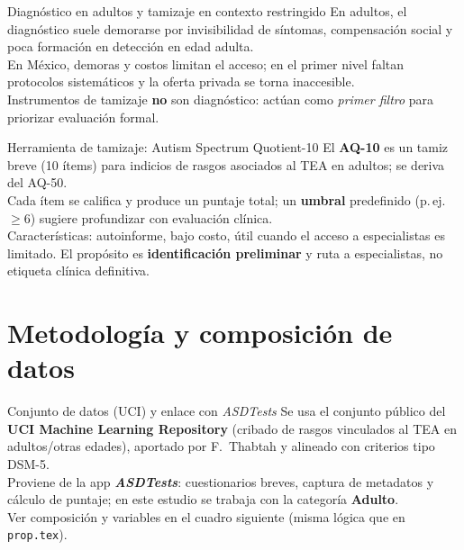 \documentclass[11pt]{beamer}
\begin{document}
\begin{frame}{Diagnóstico en adultos y tamizaje en contexto restringido}
  En adultos, el diagnóstico suele demorarse por invisibilidad de síntomas, compensación social y poca formación en detección en edad adulta.\\[0.45em]
  En México, demoras y costos limitan el acceso; en el primer nivel faltan protocolos sistemáticos y la oferta privada se torna inaccesible.\\[0.45em]
  Instrumentos de tamizaje \textbf{no} son diagnóstico: actúan como \emph{primer filtro} para priorizar evaluación formal.
\end{frame}

\begin{frame}{Herramienta de tamizaje: Autism Spectrum Quotient-10}
  El \textbf{AQ-10} es un tamiz breve (10 ítems) para indicios de rasgos asociados al TEA en adultos; se deriva del AQ-50.\\[0.4em]
  Cada ítem se califica y produce un puntaje total; un \textbf{umbral} predefinido (p.\,ej.\ $\geq 6$) sugiere profundizar con evaluación clínica.\\[0.4em]
  Características: autoinforme, bajo costo, útil cuando el acceso a especialistas es limitado. El propósito es \textbf{identificación preliminar} y ruta a especialistas, no etiqueta clínica definitiva.
\end{frame}

\section{Metodología y composición de datos}

\begin{frame}{Conjunto de datos (UCI) y enlace con \textit{ASDTests}}
  Se usa el conjunto público del \textbf{UCI Machine Learning Repository} (cribado de rasgos vinculados al TEA en adultos/otras edades), aportado por F.~Thabtah y alineado con criterios tipo DSM-5.\\[0.4em]
  Proviene de la app \textbf{\textit{ASDTests}}: cuestionarios breves, captura de metadatos y cálculo de puntaje; en este estudio se trabaja con la categoría \textbf{Adulto}.\\[0.4em]
  \footnotesize\color{gray} Ver composición y variables en el cuadro siguiente (misma lógica que en \texttt{prop.tex}).
\end{frame}
\end{document}
